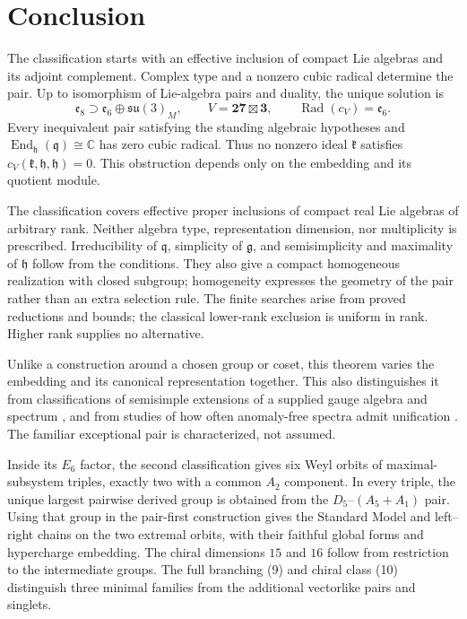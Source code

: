 \documentclass[11pt]{article}
\theoremstyle{remark}
\begin{document}
\section{Conclusion}

The classification starts with an effective inclusion of compact Lie
algebras and its adjoint complement. Complex type and a nonzero cubic
radical determine the pair. Up to isomorphism of Lie-algebra pairs and
duality, the unique solution is
\[
 \mathfrak e_8\supset\mathfrak e_6\oplus\mathfrak{su}(3)_M,
 \qquad V=\mathbf{27}\boxtimes\mathbf3,
 \qquad\operatorname{Rad}(c_V)=\mathfrak e_6.
\]
Every inequivalent pair satisfying the standing algebraic hypotheses and
\(\operatorname{End}_{\mathfrak h}(\mathfrak q)\cong\mathbb C\) has zero
cubic radical. Thus no nonzero ideal \(\mathfrak k\) satisfies
\(c_V(\mathfrak k,\mathfrak h,\mathfrak h)=0\). This obstruction depends
only on the embedding and its quotient module.

The classification covers effective proper inclusions of compact real Lie
algebras of arbitrary rank. Neither algebra type, representation dimension, nor multiplicity is
prescribed. Irreducibility of \(\mathfrak q\), simplicity of \(\mathfrak g\),
and semisimplicity and maximality of \(\mathfrak h\) follow from the conditions.
They also give a compact homogeneous realization with closed subgroup;
homogeneity expresses the geometry of the pair rather than an extra
selection rule.
The finite searches arise from proved reductions and bounds; the classical
lower-rank exclusion is uniform in rank. Higher rank supplies no alternative.

Unlike a construction around a chosen group or coset, this theorem varies
the embedding and its canonical representation together. This also
distinguishes it from classifications of semisimple extensions of a supplied
gauge algebra and spectrum \cite{GomesRuhdorferToobySmith}, and from studies
of how often anomaly-free spectra admit unification \cite{HermsRuhdorfer}.
The familiar exceptional pair is characterized, not assumed.

Inside its \(E_6\) factor, the second classification gives six Weyl orbits
of maximal-subsystem triples, exactly two with a common \(A_2\) component.
In every triple, the unique largest pairwise derived group is obtained
from the \(D_5\)--\((A_5+A_1)\) pair. Using that group in the
pair-first construction gives the Standard Model and left--right chains
on the two extremal orbits, with their faithful global forms and hypercharge
embedding. The chiral dimensions \(15\) and \(16\) follow from restriction
to the intermediate groups. The full branching \textup{(9)} and chiral
class \textup{(10)} distinguish three minimal families from the additional
vectorlike pairs and singlets.
\end{document}
